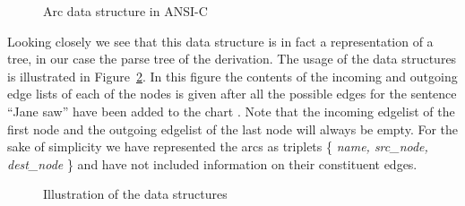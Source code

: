 \footnotesize
\begin{figure}
\begin{center}
\end{center}
\caption{Arc data structure in ANSI-C}
\label{cstruct}
\end{figure}
\normalsize


Looking closely we see that this data structure is in fact a
representation of a tree, in our case the parse tree of the
derivation. The usage of the data structures is illustrated in
Figure~\ref{datas}. In this figure the contents of the incoming and
outgoing edge lists of each of the nodes is given after all the
possible edges for the sentence ``Jane saw'' have been added to the
chart . Note that the incoming edgelist of 
the first node and the outgoing edgelist of the last node will always
be empty. For the sake of simplicity we have represented the arcs as triplets 
\{ {\em name, src\_node, dest\_node} \} and have not included
information on their constituent edges. 

\begin{figure}[tbh]
\centerline{
}
\caption{Illustration of the data structures}
\label{datas}
\end{figure}


